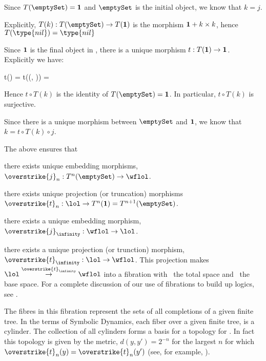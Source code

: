 \item Since $T(\emptySet) = \bold{1}$ and $\emptySet$ is the initial 
object, we know that $k = j$. 

\item Explicitly, $T(k) : T(\emptySet) \rightarrow T(\bold{1})$ is the 
morphism $\bold{1} + k \times k$, hence $T(\type{nil}) = \type{nil}$ 

\item Since $\bold{1}$ is the final object in \Set, there is a unique 
morphism $t: T(\bold{1}) \rightarrow \bold{1}$. Explicitly we have:

\startformula\startalign
  \NC t()               \NC =  \NR
  \NC t((, )) \NC =  \NR
\stopalign\stopformula

\noindent Hence $t \circ T(k)$ is the identity of $T(\emptySet) = 
\bold{1}$. In particular, $t \circ T(k)$ is surjective.

\item Since there is a unique morphism between $\emptySet$ and $\bold{1}$, 
we know that $k = t \circ T(k) \circ j$. 

\item The above ensures that

\startitemize[a]

\item there exists unique embedding morphisms, 
$\overstrike{j}_n : T^n(\emptySet) \rightarrow \wflol$. 

\item there exists unique projection (or truncation) 
morphisms $\overstrike{t}_n : \lol \rightarrow T^n(\bold{1}) = 
T^{n+1}(\emptySet)$. 

\item there exists a unique embedding morphism, 
$\overstrike{j}_{\infinity} : \wflol \rightarrow \lol$. 

\item there exists a unique projection (or trunction) morphism, 
$\overstrike{t}_{\infinity} : \lol \rightarrow \wflol$. This projection 
makes $\lol \overset{\overstrike{t}_{\infinity}}{\rightarrow} \wflol$ into 
a fibration with \lol\ the total space and \wflol\ the base space. For a 
complete discussion of our use of fibrations to build up logics, see 
\cite{jacobs1999categoricalLogicTypeTheory}.  

The fibres in this fibration represent the sets of all completions of a 
given finite tree. In the terms of Symbolic Dynamics, each fiber over a 
given finite tree, is a cylinder. The collection of all cylinders forms a 
basis for a topology for \lol. In fact this topology is given by the 
metric, $d(y, y') = 2^{-n}$ for the largest $n$ for which 
$\overstrike{t}_n(y) = \overstrike{t}_n(y')$ (see, for example, 
\cite{barr1993terminalCoalgebrasWellFounded}). 

